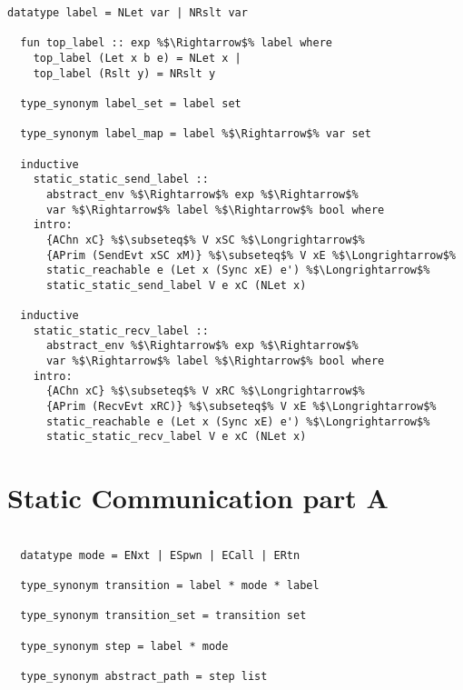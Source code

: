 \documentclass{article}
\begin{document}
\begin{lstlisting}[style=codestyle1, escapechar=\%]
  datatype label = NLet var | NRslt var

  fun top_label :: exp %$\Rightarrow$% label where
    top_label (Let x b e) = NLet x |
    top_label (Rslt y) = NRslt y

  type_synonym label_set = label set

  type_synonym label_map = label %$\Rightarrow$% var set

  inductive
    static_static_send_label ::
      abstract_env %$\Rightarrow$% exp %$\Rightarrow$%
      var %$\Rightarrow$% label %$\Rightarrow$% bool where
    intro:
      {AChn xC} %$\subseteq$% V xSC %$\Longrightarrow$%
      {APrim (SendEvt xSC xM)} %$\subseteq$% V xE %$\Longrightarrow$%
      static_reachable e (Let x (Sync xE) e') %$\Longrightarrow$%
      static_static_send_label V e xC (NLet x)

  inductive
    static_static_recv_label ::
      abstract_env %$\Rightarrow$% exp %$\Rightarrow$%
      var %$\Rightarrow$% label %$\Rightarrow$% bool where
    intro:
      {AChn xC} %$\subseteq$% V xRC %$\Longrightarrow$%
      {APrim (RecvEvt xRC)} %$\subseteq$% V xE %$\Longrightarrow$%
      static_reachable e (Let x (Sync xE) e') %$\Longrightarrow$%
      static_static_recv_label V e xC (NLet x)

  \end{lstlisting}

\section{Static Communication part A}
\begin{lstlisting}[style=codestyle1, escapechar=\%]

  datatype mode = ENxt | ESpwn | ECall | ERtn

  type_synonym transition = label * mode * label

  type_synonym transition_set = transition set

  type_synonym step = label * mode

  type_synonym abstract_path = step list
  \end{lstlisting}
\end{document}
